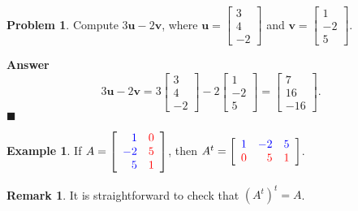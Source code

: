 \documentclass[12pt,letterpaper]{book}
\def\red{\textcolor{red}}
\def\blue{\textcolor{blue}}
\numberwithin{equation}{section}
\theoremstyle{definition}
\newtheorem{problem}[thm]{\textbf{Problem}}
\newtheorem{example}[thm]{\textbf{Example}}
\newtheorem{remark}[thm]{\textbf{Remark}}
\newenvironment{answer}{\noindent\textbf{Answer}}{\hfill$\blacksquare$\vspace{0.1in}}
\newcommand{\vu}{\bm{u}}
\newcommand{\vv}{\bm{v}}
\begin{document}
\begin{problem} Compute $3\vu-2\vv$, where $\vu=\left[\begin{array}{r}
3 \\ 4 \\ -2
\end{array}\right]$  and $\vv=\left[\begin{array}{r} 1 \\ -2 \\ 5
\end{array}\right]$.
\end{problem}

\begin{answer}
$$3\vu-2\vv=3\left[\begin{array}{r} 3 \\ 4 \\ -2 \end{array}\right]-2\left[\begin{array}{r} 1 \\ -2 \\ 5 \end{array}\right]=\left[\begin{array}{r} 7 \\ 16 \\ -16 \end{array}\right].$$
\end{answer}

\begin{example}
If $A=\left[\begin{array}{rr} \blue{1} & \red{0} \\ \blue{-2} & \red{5} \\ \blue{5} & \red{1}
\end{array}\right]$, then $A^t=\left[\begin{array}{rrr} \blue{1} & \blue{-2} & \blue{5} \\ \red{0} & \red{5} & \red{1}
\end{array}\right]$.
\end{example}

\begin{remark}
It is straightforward to check that $(A^t)^t=A$.
\end{remark}
\end{document}
